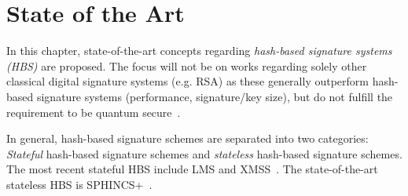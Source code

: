 \chapter{State of the Art}
\label{cha:stateOfTheArt}

In this chapter, state-of-the-art concepts regarding \textit{hash-based signature systems (HBS)} are proposed. The focus will not be on works regarding solely other classical digital signature systems (e.g. RSA) as these generally outperform hash-based signature systems (performance, signature/key size), but do not fulfill the requirement to be quantum secure~\cite{RSA_pq-attack_examples_2018,comparison_performance_RSA_ECDSA_Merkle_WOTS_2021}.

In general, hash-based signature schemes are separated into two categories: \textit{Stateful} hash-based signature schemes and \textit{stateless} hash-based signature schemes. The most recent stateful HBS include LMS and XMSS~\cite{stateful_hashbased_sign_schemes_NIST_2020}. The state-of-the-art stateless HBS is SPHINCS+~\cite{tweakable_basispaper_sphincs_2019}. %








